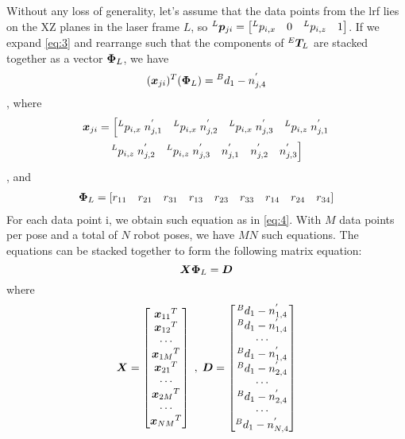 Without any loss of generality, let's assume that the data points from the \ac{lrf} lies on the XZ planes in the laser frame $L$, so ${^L}\vb*{p}_{ji} = \left[{^L}p_{i,x} \quad 0 \quad {^L}p_{i,z}\quad 1\right]$. If we expand \eqref{eq:3} and rearrange such that the components of ${^E}\vb*{T}_L$ are stacked together as a vector $\vb*{\Phi}_L$, we have
\begin{equation}
\label{eq:4}
  (\vb*{x}_{ji})  ^T (\vb*{\Phi}_L) = {^B}d_1 -  n^{'}_{j,4}
\end{equation}
, where 
\begin{multline}
  \vb*{x}_{ji} = \left[{^L}p_{i,x}\;n^{'}_{j,1} \quad {^L}p_{i,x}\;n^{'}_{j,2}\quad {^L}p_{i,x}\;n^{'}_{j,3}\quad  {^L}p_{i,z}\;n^{'}_{j,1}\right. \\ 
\left. {^L}p_{i,z}\;n^{'}_{j,2}\quad {^L}p_{i,z}\;n^{'}_{j,3} \quad n^{'}_{j,1} \quad n^{'}_{j,2} \quad n^{'}_{j,3} \right]
\end{multline}, 
and
\begin{multline}
  \vb*{\Phi}_L= \left[r_{11} \quad r_{21} \quad r_{31} \quad r_{13} \quad r_{23} \quad r_{33} \quad r_{14} \quad r_{24}  \quad r_{34} \right] 
\end{multline}
For each data point i, we obtain such equation as in \eqref{eq:4}. With $M$ data points per pose and a total of $N$ robot poses, we have $MN$ such equations. The equations can be stacked together to form the following matrix equation:
\begin{equation}
\label{eq:7}
  \vb*{X}   \vb*{\Phi}_L= \vb*{D}
\end{equation}
where 
\begin{equation}
\vb*{X} =\begin{bmatrix}
{\vb*{x}_{11}}^T \\ {\vb*{x}_{12}}^T  \\ \cdots\\{\vb*{x}_{1M}}^T \\ {\vb*{x}_{21}}^T \\ \cdots\\ {\vb*{x}_{2M}}^T  \\ \cdots \\ {\vb*{x}_{NM}}^T 
\end{bmatrix} \;, \; \vb*{D} =\begin{bmatrix}
{^B}d_1 -  n^{'}_{1,4} \\ {^B}d_1 -  n^{'}_{1,4}  \\ \cdots\\ {^B}d_1 -  n^{'}_{1,4}  \\ {^B}d_1 -  n^{'}_{2,4} \\ \cdots\\ {^B}d_1 -  n^{'}_{2,4}  \\ \cdots \\{^B}d_1 -  n^{'}_{N,4} 
\end{bmatrix}
\end{equation}
